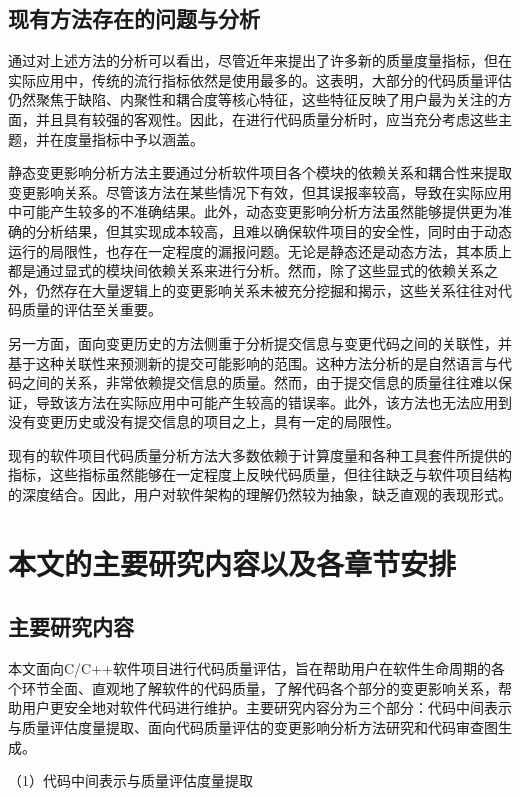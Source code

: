 \subsection{现有方法存在的问题与分析}
通过对上述方法的分析可以看出，尽管近年来提出了许多新的质量度量指标，但在实际应用中，传统的流行指标依然是使用最多的。这表明，大部分的代码质量评估仍然聚焦于缺陷、内聚性和耦合度等核心特征，这些特征反映了用户最为关注的方面，并且具有较强的客观性。因此，在进行代码质量分析时，应当充分考虑这些主题，并在度量指标中予以涵盖。

静态变更影响分析方法主要通过分析软件项目各个模块的依赖关系和耦合性来提取变更影响关系。尽管该方法在某些情况下有效，但其误报率较高，导致在实际应用中可能产生较多的不准确结果。此外，动态变更影响分析方法虽然能够提供更为准确的分析结果，但其实现成本较高，且难以确保软件项目的安全性，同时由于动态运行的局限性，也存在一定程度的漏报问题。无论是静态还是动态方法，其本质上都是通过显式的模块间依赖关系来进行分析。然而，除了这些显式的依赖关系之外，仍然存在大量逻辑上的变更影响关系未被充分挖掘和揭示，这些关系往往对代码质量的评估至关重要。

另一方面，面向变更历史的方法侧重于分析提交信息与变更代码之间的关联性，并基于这种关联性来预测新的提交可能影响的范围。这种方法分析的是自然语言与代码之间的关系，非常依赖提交信息的质量。然而，由于提交信息的质量往往难以保证，导致该方法在实际应用中可能产生较高的错误率。此外，该方法也无法应用到没有变更历史或没有提交信息的项目之上，具有一定的局限性。

现有的软件项目代码质量分析方法大多数依赖于计算度量和各种工具套件所提供的指标，这些指标虽然能够在一定程度上反映代码质量，但往往缺乏与软件项目结构的深度结合。因此，用户对软件架构的理解仍然较为抽象，缺乏直观的表现形式。



\section{本文的主要研究内容以及各章节安排}
\subsection{主要研究内容}
本文面向C/C++软件项目进行代码质量评估，旨在帮助用户在软件生命周期的各个环节全面、直观地了解软件的代码质量，了解代码各个部分的变更影响关系，帮助用户更安全地对软件代码进行维护。主要研究内容分为三个部分：代码中间表示与质量评估度量提取、面向代码质量评估的变更影响分析方法研究和代码审查图生成。

（1）代码中间表示与质量评估度量提取

